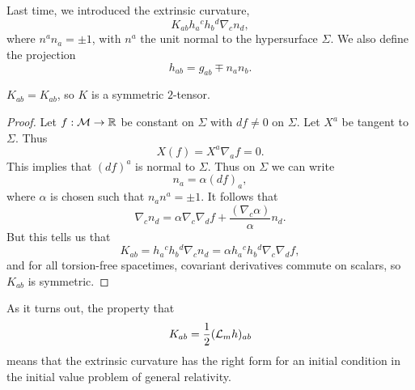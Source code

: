 Last time, we introduced the extrinsic curvature,
\begin{equation}
    K_{ab} h_a{}^c h_b{}^d \nabla_c n_d,
\end{equation}
where $n^a n_a= \pm1$, with $n^a$ the unit normal to the hypersurface $\Sigma$. We also define the projection
\begin{equation}
    h_{ab}=g_{ab} \mp n_a n_b.
\end{equation}
\begin{lem}
    $K_{ab}=K_{ab}$, so $K$ is a symmetric $2$-tensor.
\end{lem}
\begin{proof}
    Let $f:\mathcal{M} \to \mathbb{R}$ be constant on $\Sigma$ with $df\neq 0$ on $\Sigma$. Let $X^a$ be tangent to $\Sigma$. Thus
    \begin{equation}
        X(f)=X^a \nabla_a f=0.
    \end{equation}
    This implies that $(df)^a$ is normal to $\Sigma$.
    Thus on $\Sigma$ we can write
    \begin{equation}
        n_a = \alpha(df)_{a},
    \end{equation}
    where $\alpha$ is chosen such that $n_a n^a = \pm 1$. It follows that
    \begin{equation}
        \nabla_c n_d = \alpha \nabla_c \nabla_d f +\frac{(\nabla_c \alpha)}{\alpha} n_d.
    \end{equation}
    But this tells us that
    \begin{equation}
        K_{ab}=h_a{}^c h_b{}^d \nabla_c n_d = \alpha h_a{}^c h_b{}^d \nabla_c \nabla_d f,
    \end{equation}
    and for all torsion-free spacetimes, covariant derivatives commute on scalars, so $K_{ab}$ is symmetric.
\end{proof}

As it turns out, the property that
\begin{equation}
    K_{ab}=\frac{1}{2}(\mathcal L_m h)_{ab}
\end{equation}
means that the extrinsic curvature has the right form for an initial condition in the initial value problem of general relativity.

